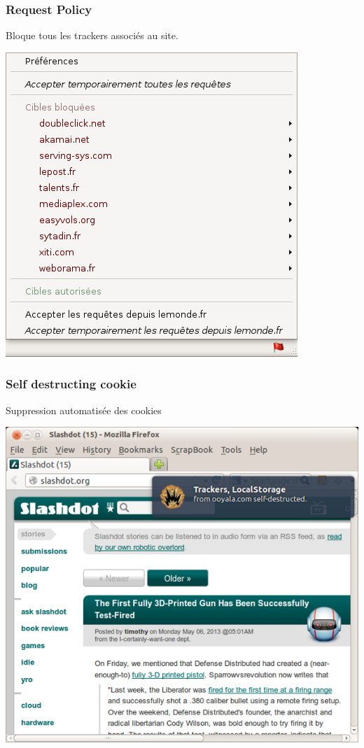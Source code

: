 \documentclass{beamer}
\begin{document}
\begin{frame}
\frametitle{Request Policy}

Bloque tous les trackers associés au site.

\begin{center}
\includegraphics[scale=0.4] {./images/RequestPolicy.png}
\end{center}
\end{frame}


\begin{frame}
\frametitle{Self destructing cookie}

Suppression automatisée des cookies

\begin{center}
\includegraphics[scale=0.4] {./images/selfdestructingcookie.png}
\end{center}
\end{frame}
\end{document}
